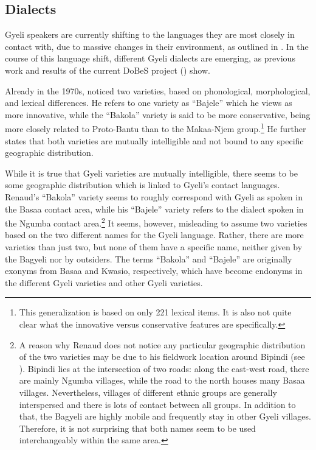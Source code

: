 \subsection{Dialects}
\label{sec:dialects}

Gyeli speakers are currently shifting to the languages they are most closely in contact with, due to massive changes in their environment, as outlined in . In the course of this language shift, different Gyeli dialects are emerging, as previous work and results of the current DoBeS project () show. 

Already in the 1970s, \citet[29]{renaud76} noticed two varieties, based on phonological, morphological, and lexical differences. He refers to one variety as  ``Bajele'' which he views as more innovative, while the ``Bakola'' variety is said to be more conservative, being more closely related to Proto-Bantu than to the Makaa-Njem group.\footnote{This generalization is based on only 221 lexical items. It is also not quite clear what the innovative versus conservative features are specifically.} He further states that both varieties are mutually intelligible and not bound to any specific geographic distribution.

While it is true that Gyeli varieties are mutually intelligible, there seems to be some geographic distribution which is linked to Gyeli's contact languages. Renaud's ``Bakola'' variety seems to roughly correspond with Gyeli as spoken in the Basaa contact area, while his ``Bajele'' variety refers to the dialect spoken in the Ngumba contact area.\footnote{A reason why Renaud does not notice any particular geographic distribution of the two varieties may be due to his fieldwork location around Bipindi (see ). Bipindi lies at the intersection of two roads: along the east-west road, there are mainly Ngumba villages, while the road to the north houses many Basaa villages. Nevertheless, villages of different ethnic groups are generally interspersed and there is lots of contact between all groups. In addition to that, the Bagyeli are highly mobile and frequently stay in other Gyeli villages. Therefore, it is not surprising that both names seem to be used interchangeably within the same area.}
It seems, however, misleading to assume two varieties based on the two different names for the Gyeli language.  Rather, there are more varieties than just two, but none of them have a specific name, neither given by the Bagyeli nor by outsiders. The terms ``Bakola'' and ``Bajele'' are originally exonyms from Basaa and Kwasio, respectively, which have become endonyms in the different Gyeli varieties and other Gyeli varieties. 

